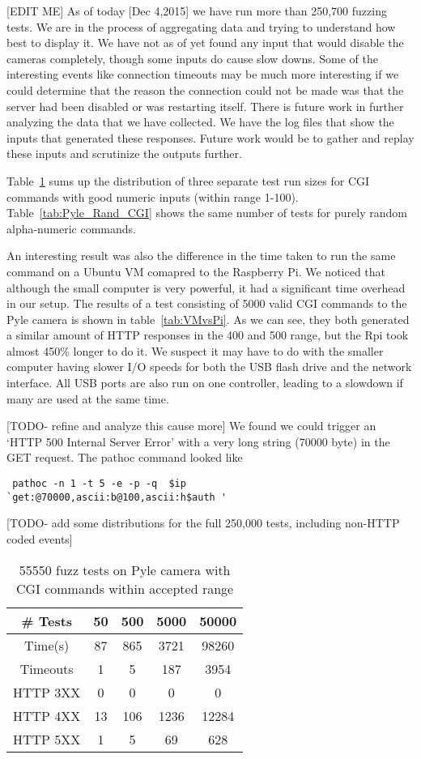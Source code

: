 \documentclass[letterpaper,twocolumn,10pt]{article}
\begin{document}
[EDIT ME]
As of today [Dec 4,2015] we have run more than 250,700 fuzzing tests. We are in the process of aggregating data and trying to understand how best to display it. We have not as of yet found any input that would disable the cameras completely, though some inputs do cause slow downs. Some of the interesting events like connection timeouts may be much more interesting if we could determine that the reason the connection could not be made was that the server had been disabled or was restarting itself. There is future work in further analyzing the data that we have collected. We have the log files that show the inputs that generated these responses. Future work would be to gather and replay these inputs and scrutinize the outputs further. 

Table~\ref{tab:Pyle_Good_CGI} sums up the distribution of three separate test run sizes for CGI commands with good numeric inputs (within range 1-100). Table~\ref{tab:Pyle_Rand_CGI} shows the same number of tests for purely random alpha-numeric commands.

An interesting result was also the difference in the time taken to run the same command on a Ubuntu VM comapred to the Raspberry Pi. We noticed that although the small computer is very powerful, it had a significant time overhead in our setup. The results of a test consisting of 5000 valid CGI commands to the Pyle camera is shown in table~\ref{tab:VMvsPi}. As we can see, they both generated a similar amount of HTTP responses in the 400 and 500 range, but the Rpi took almost 450\% longer to do it. We suspect it may have to do with the smaller computer having slower I/O speeds for both the USB flash drive and the network interface. All USB ports are also run on one controller, leading to a slowdown if many are used at the same time.

[TODO- refine and analyze this cause more]
We found we could trigger an `HTTP 500 Internal Server Error' with a very long string (70000 byte) in the GET request. The pathoc command looked like 
\begin{verbatim} pathoc -n 1 -t 5 -e -p -q  $ip 
`get:@70000,ascii:b@100,ascii:h$auth '  \end{verbatim}

[TODO- add some distributions for the full 250,000 tests, including non-HTTP coded events]

\begin{table}[h]
\centering
	\begin{tabular}{ |c|c|c|c|c| }
		\hline
		\# Tests & 50 & 500 & 5000 & 50000 \\
		\hline
		\hline
		Time(s) & 87 & 865 & 3721 & 98260\\
		Timeouts & 1 & 5 & 187 & 3954 \\
		HTTP 3XX & 0 & 0 & 0 & 0\\
		HTTP 4XX & 13 & 106 & 1236 & 12284\\
		HTTP 5XX & 1 & 5 & 69 & 628\\
		\hline
	\end{tabular}
	\caption{55550 fuzz tests on Pyle camera with CGI commands within accepted range}
	\label{tab:Pyle_Good_CGI} 
\end{table}
\end{document}
